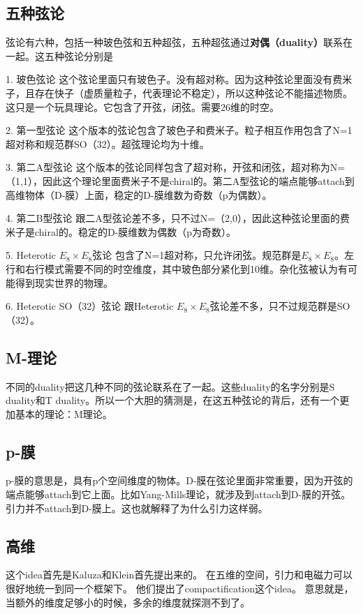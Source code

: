 
\begin{issues}
\issueNeedCite
\issueMissDepend
\end{issues}

\subsection{五种弦论}

弦论有六种，包括一种玻色弦和五种超弦，五种超弦通过\textbf{对偶（duality）}联系在一起。这五种弦论分别是

1. 玻色弦论
这个弦论里面只有玻色子。没有超对称。因为这种弦论里面没有费米子，且存在快子（虚质量粒子，代表理论不稳定），所以这种弦论不能描述物质。这只是一个玩具理论。它包含了开弦，闭弦。需要26维的时空。

2. 第一型弦论
这个版本的弦论包含了玻色子和费米子。粒子相互作用包含了N=1超对称和规范群SO（32）。超弦理论均为十维。

3. 第二A型弦论
这个版本的弦论同样包含了超对称，开弦和闭弦，超对称为N=（1,1），因此这个理论里面费米子不是chiral的。第二A型弦论的端点能够attach到高维物体（D-膜）上面，稳定的D-膜维数为奇数（p为偶数）。

4. 第二B型弦论
跟二A型弦论差不多，只不过N=（2,0），因此这种弦论里面的费米子是chiral的。稳定的D-膜维数为偶数（p为奇数）。

5. Heterotic $E_8\times E_8$弦论
包含了N=1超对称，只允许闭弦。规范群是$E_8\times E_8$。左行和右行模式需要不同的时空维度，其中玻色部分紧化到10维。杂化弦被认为有可能得到现实世界的物理。

6. Heterotic SO（32）弦论
跟Heterotic $E_8\times E_8$弦论差不多，只不过规范群是SO（32）。

\subsection{M-理论}
不同的duality把这几种不同的弦论联系在了一起。这些duality的名字分别是S duality和T duality。所以一个大胆的猜测是，在这五种弦论的背后，还有一个更加基本的理论：M理论。

\subsection{p-膜}
p-膜的意思是，具有p个空间维度的物体。D-膜在弦论里面非常重要，因为开弦的端点能够attach到它上面。比如Yang-Mills理论，就涉及到attach到D-膜的开弦。 引力并不attach到D-膜上。这也就解释了为什么引力这样弱。

\subsection{高维}
这个idea首先是Kaluza和Klein首先提出来的。 在五维的空间，引力和电磁力可以很好地统一到同一个框架下。 他们提出了compactification这个idea。
意思就是，当额外的维度足够小的时候，多余的维度就探测不到了。 
